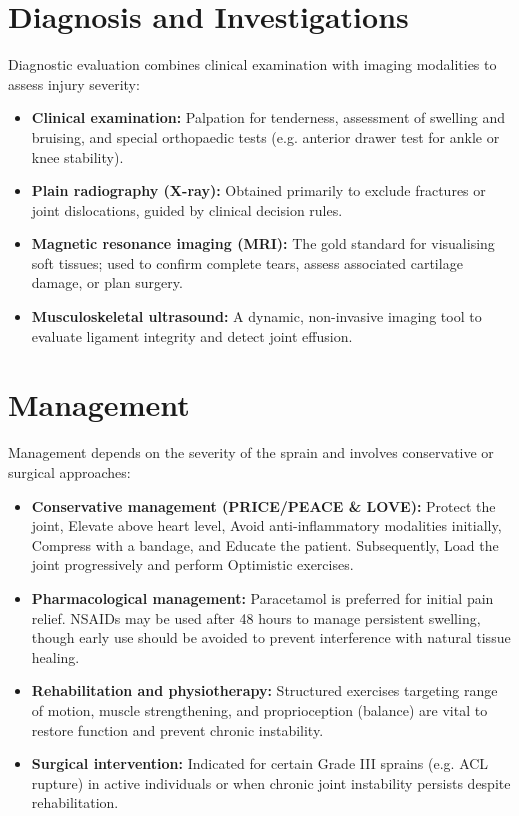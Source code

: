 \section*{Diagnosis and Investigations}
Diagnostic evaluation combines clinical examination with imaging modalities to assess injury severity:
\begin{itemize}
    \item \textbf{Clinical examination:} Palpation for tenderness, assessment of swelling and bruising, and special orthopaedic tests (e.g. anterior drawer test for ankle or knee stability).
    \item \textbf{Plain radiography (X-ray):} Obtained primarily to exclude fractures or joint dislocations, guided by clinical decision rules.
    \item \textbf{Magnetic resonance imaging (MRI):} The gold standard for visualising soft tissues; used to confirm complete tears, assess associated cartilage damage, or plan surgery.
    \item \textbf{Musculoskeletal ultrasound:} A dynamic, non-invasive imaging tool to evaluate ligament integrity and detect joint effusion.
\end{itemize}

\section*{Management}
Management depends on the severity of the sprain and involves conservative or surgical approaches:
\begin{itemize}
    \item \textbf{Conservative management (PRICE/PEACE \& LOVE):} Protect the joint, Elevate above heart level, Avoid anti-inflammatory modalities initially, Compress with a bandage, and Educate the patient. Subsequently, Load the joint progressively and perform Optimistic exercises.
    \item \textbf{Pharmacological management:} Paracetamol is preferred for initial pain relief. NSAIDs may be used after 48 hours to manage persistent swelling, though early use should be avoided to prevent interference with natural tissue healing.
    \item \textbf{Rehabilitation and physiotherapy:} Structured exercises targeting range of motion, muscle strengthening, and proprioception (balance) are vital to restore function and prevent chronic instability.
    \item \textbf{Surgical intervention:} Indicated for certain Grade III sprains (e.g. ACL rupture) in active individuals or when chronic joint instability persists despite rehabilitation.
\end{itemize}

